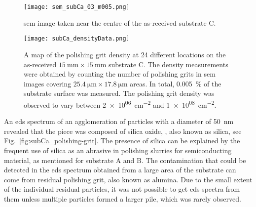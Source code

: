 \begin{figure}[htbp]
    \centering
    \texttt{[image: sem\_subCa\_03\_m005.png]}
    \caption[\Ac{sem} image taken near the centre of the as-received substrate C.]{\Ac{sem} image taken near the centre of the as-received substrate C.}
    \label{fig:subCa_sem_area}
\end{figure}

\begin{figure}[htbp]
    \centering
    \texttt{[image: subCa\_densityData.png]}
    \caption[Map of the polishing grit density on the as-received substrate C.]{A map of the polishing grit density at 24 different locations on the as-received $\SI{15}{\milli\metre}\times\SI{15}{\milli\metre}$ substrate C. The density measurements were obtained by counting the number of polishing grits in \ac{sem} images covering $\SI{25.4}{\micro\metre}\times\SI{17.8}{\micro\metre}$ areas. In total, \SI{0.005}{\percent} of the substrate surface was measured. The polishing grit density was observed to vary between \SI{2e+06}{\centi\metre^{-2}} and \SI{1e+08}{\centi\metre^{-2}}.}
    \label{fig:subCa_densityData}
\end{figure}

An \ac{eds} spectrum of an agglomeration of particles with a diameter of \SI{50}{\nano\metre} revealed that the piece was composed of silica oxide, , also known as silica, see Fig.~\ref{fig:subCa_polishing-grit}. The presence of silica can be explained by the frequent use of silica as an abrasive in polishing slurries for semiconducting material, as mentioned for substrate A and B. The  contamination that could be detected in the \ac{eds} spectrum obtained from a large area of the substrate can come from residual  polishing grit, also known as alumina. Due to the small extent of the individual residual particles, it was not possible to get \ac{eds} spectra from them unless multiple particles formed a larger pile, which was rarely observed.

